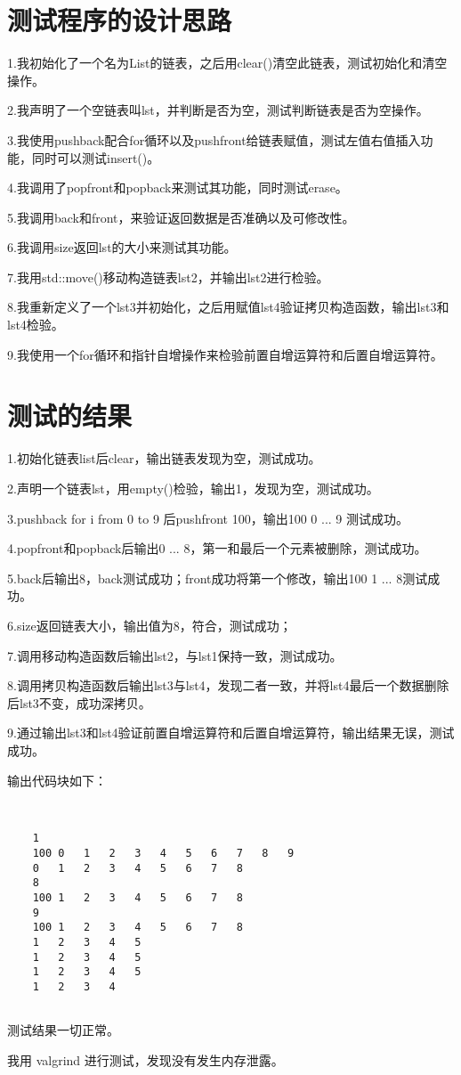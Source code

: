 \documentclass[UTF8]{ctexart}
\begin{document}
	
	\pagestyle{fancy}
	\fancyhead{}
	
	\section{测试程序的设计思路}
	
	1.我初始化了一个名为List的链表，之后用clear()清空此链表，测试初始化和清空操作。
	
	2.我声明了一个空链表叫lst，并判断是否为空，测试判断链表是否为空操作。
	
	3.我使用pushback配合for循环以及pushfront给链表赋值，测试左值右值插入功能，同时可以测试insert()。	
	
	4.我调用了popfront和popback来测试其功能，同时测试erase。
	
	5.我调用back和front，来验证返回数据是否准确以及可修改性。
	
	6.我调用size返回lst的大小来测试其功能。
	
	7.我用std::move()移动构造链表lst2，并输出lst2进行检验。
	
	8.我重新定义了一个lst3并初始化，之后用赋值lst4验证拷贝构造函数，输出lst3和lst4检验。
	
	9.我使用一个for循环和指针自增操作来检验前置自增运算符和后置自增运算符。
	\section{测试的结果}
	1.初始化链表list后clear，输出链表发现为空，测试成功。
	
	2.声明一个链表lst，用empty()检验，输出1，发现为空，测试成功。
	
	3.pushback for i from 0 to 9 后pushfront 100，输出100 0 ... 9 测试成功。 
	
	4.popfront和popback后输出0 ... 8，第一和最后一个元素被删除，测试成功。
	
	5.back后输出8，back测试成功；front成功将第一个修改，输出100 1 ... 8测试成功。
	
	6.size返回链表大小，输出值为8，符合，测试成功；
	
	7.调用移动构造函数后输出lst2，与lst1保持一致，测试成功。
	
	8.调用拷贝构造函数后输出lst3与lst4，发现二者一致，并将lst4最后一个数据删除后lst3不变，成功深拷贝。
	
	9.通过输出lst3和lst4验证前置自增运算符和后置自增运算符，输出结果无误，测试成功。
	
	输出代码块如下：
	\begin{lstlisting}
	
	
	1
	100	0	1	2	3	4	5	6	7	8	9	
	0	1	2	3	4	5	6	7	8	
	8
	100	1	2	3	4	5	6	7	8	
	9
	100	1	2	3	4	5	6	7	8	
	1	2	3	4	5	
	1	2	3	4	5	
	1	2	3	4	5	
	1	2	3	4	
	
	\end{lstlisting}
	
		
	测试结果一切正常。
	
	我用 valgrind 进行测试，发现没有发生内存泄露。
	
	
\end{document}
